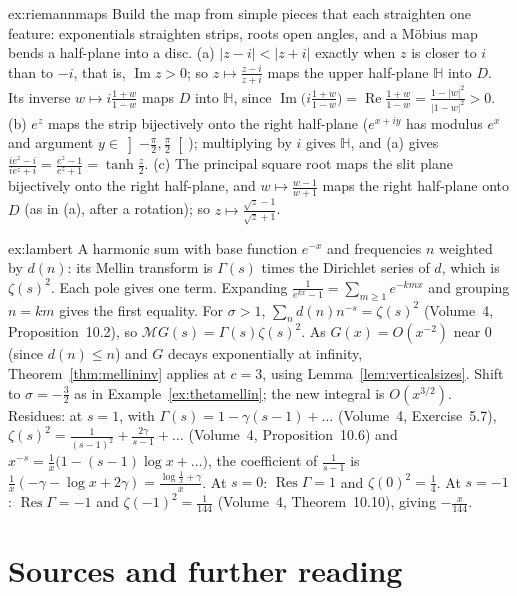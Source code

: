 \begin{solution}{ex:riemannmaps}
\idea Build the map from simple pieces that each straighten one feature: exponentials straighten strips, roots open angles, and a M\"obius map bends a half-plane into a disc.
\writeup (a) $|z-i|<|z+i|$ exactly when $z$ is closer to $i$ than to $-i$, that is, $\operatorname{Im}z>0$; so $z\mapsto\frac{z-i}{z+i}$ maps the upper half-plane $\mathbb H$ into $D$. Its inverse $w\mapsto i\frac{1+w}{1-w}$
maps $D$ into $\mathbb H$, since $\operatorname{Im}\bigl(i\frac{1+w}{1-w}\bigr)=\operatorname{Re}\frac{1+w}{1-w}=\frac{1-|w|^2}{|1-w|^2}>0$. (b) $e^z$ maps the strip bijectively onto the right half-plane ($e^{x+iy}$ has modulus $e^x$ and argument
$y\in\left]-\frac\pi2,\frac\pi2\right[$); multiplying by $i$ gives $\mathbb H$, and (a) gives $\frac{ie^z-i}{ie^z+i}=\frac{e^z-1}{e^z+1}=\tanh\frac z2$. (c) The principal square root maps the slit plane bijectively onto the right
half-plane, and $w\mapsto\frac{w-1}{w+1}$ maps the right half-plane onto $D$ (as in (a), after a rotation); so $z\mapsto\frac{\sqrt z-1}{\sqrt z+1}$.
\end{solution}

\begin{solution}{ex:lambert}
\idea A harmonic sum with base function $e^{-x}$ and frequencies $n$ weighted by $d(n)$: its Mellin transform is $\Gamma(s)$ times the Dirichlet series of $d$, which is $\zeta(s)^2$. Each pole gives one term.
\writeup Expanding $\frac1{e^{kx}-1}=\sum_{m\ge1}e^{-kmx}$ and grouping $n=km$ gives the first equality. For $\sigma>1$, $\sum_nd(n)n^{-s}=\zeta(s)^2$ (Volume~4, Proposition~10.2), so $\mathcal MG(s)=\Gamma(s)\zeta(s)^2$. As
$G(x)=O(x^{-2})$ near $0$ (since $d(n)\le n$) and $G$ decays exponentially at infinity, Theorem~\ref{thm:mellininv} applies at $c=3$, using Lemma~\ref{lem:verticalsizes}. Shift to $\sigma=-\frac32$ as in
Example~\ref{ex:thetamellin}; the new integral is $O(x^{3/2})$. Residues: at $s=1$, with $\Gamma(s)=1-\gamma(s-1)+\dots$ (Volume~4, Exercise~5.7), $\zeta(s)^2=\frac1{(s-1)^2}+\frac{2\gamma}{s-1}+\dots$ (Volume~4,
Proposition~10.6) and $x^{-s}=\frac1x\bigl(1-(s-1)\log x+\dots\bigr)$, the coefficient of $\frac1{s-1}$ is $\frac1x(-\gamma-\log x+2\gamma)=\frac{\log\frac1x+\gamma}x$. At $s=0$: $\operatorname{Res}\Gamma=1$ and $\zeta(0)^2=\frac14$. At $s=-1$:
$\operatorname{Res}\Gamma=-1$ and $\zeta(-1)^2=\frac1{144}$ (Volume~4, Theorem~10.10), giving $-\frac x{144}$.
\end{solution}

\section*{Sources and further reading}

